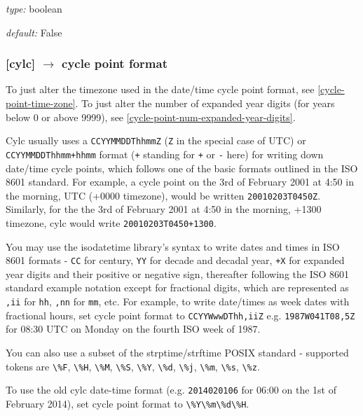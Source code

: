 \begin{myitemize}
    \item {\em type:} boolean
    \item {\em default:} False
\end{myitemize}

\subsubsection[cycle point format]{ [cylc] $\rightarrow$ cycle point format}
\label{cycle-point-format}

To just alter the timezone used in the date/time cycle point format, see
\ref{cycle-point-time-zone}. To just alter the number of expanded year digits
(for years below 0 or above 9999), see
\ref{cycle-point-num-expanded-year-digits}.

Cylc usually uses a \lstinline=CCYYMMDDThhmmZ= (\lstinline=Z= in the special
case of UTC) or \lstinline=CCYYMMDDThhmm+hhmm= format (\lstinline=+= standing
for \lstinline=+= or \lstinline=-= here) for writing down date/time cycle
points, which follows one of the basic formats outlined in the ISO 8601
standard. For example, a cycle point on the 3rd of February 2001 at 4:50 in
the morning, UTC (+0000 timezone), would be written
\lstinline=20010203T0450Z=. Similarly, for the the 3rd of February 2001 at
4:50 in the morning, +1300 timezone, cylc would write
\lstinline=20010203T0450+1300=.

You may use the isodatetime library's syntax to write dates and times in ISO
8601 formats - \lstinline=CC= for century, \lstinline=YY= for decade and
decadal year, \lstinline=+X= for expanded year digits and their positive or
negative sign, thereafter following the ISO 8601 standard example notation
except for fractional digits, which are represented as \lstinline=,ii= for
\lstinline=hh=, \lstinline=,nn= for \lstinline=mm=, etc. For example, to write
date/times as week dates with fractional hours, set cycle point format to
\lstinline=CCYYWwwDThh,iiZ= e.g. \lstinline=1987W041T08,5Z= for 08:30 UTC on
Monday on the fourth ISO week of 1987.

You can also use a subset of the strptime/strftime POSIX standard - supported
tokens are \lstinline=\%F=, \lstinline=\%H=, \lstinline=\%M=, \lstinline=\%S=,
\lstinline=\%Y=, \lstinline=\%d=, \lstinline=\%j=, \lstinline=\%m=,
\lstinline=\%s=, \lstinline=\%z=.

To use the old cylc date-time format (e.g. \lstinline=2014020106= for 06:00
on the 1st of February 2014), set cycle point format to
\lstinline=\%Y\%m\%d\%H=.

